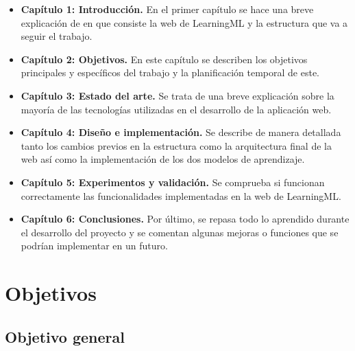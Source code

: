 \documentclass[a4paper, 12pt]{book}
\begin{document}
\begin{itemize}
  \item \textbf{Capítulo 1: Introducción.} En el primer capítulo se hace una breve explicación de en que consiste la web de LearningML y la estructura que va a seguir el trabajo.
  
  \item \textbf{Capítulo 2: Objetivos.} En este capítulo se describen los objetivos principales y específicos del trabajo y la planificación temporal de este.
  
  \item \textbf{Capítulo 3: Estado del arte.} Se trata de una breve explicación sobre la mayoría de las tecnologías utilizadas en el desarrollo de la aplicación web.

  \item \textbf{Capítulo 4: Diseño e implementación.} Se describe de manera detallada tanto los cambios previos en la estructura como la arquitectura final de la web así como la implementación de los dos modelos de aprendizaje.
  
  \item \textbf{Capítulo 5: Experimentos y validación.} Se comprueba si funcionan correctamente las funcionalidades implementadas en la web de LearningML.
  
  \item \textbf{Capítulo 6: Conclusiones.} Por último, se repasa todo lo aprendido durante el desarrollo del proyecto y se comentan algunas mejoras o funciones que se podrían implementar en un futuro.
  
\end{itemize}




\cleardoublepage %
\chapter{Objetivos} %
\label{chap:objetivos} %

\section{Objetivo general} %
\label{sec:objetivo-general} %
\end{document}
